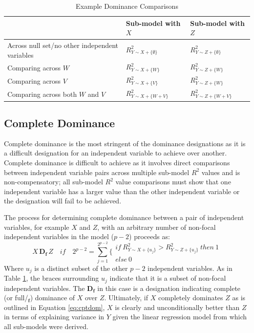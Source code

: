 \documentclass[man]{apa7}
\begin{document}
		\begin{table}[h!]
			\centering
			\caption{\centering Example Dominance Comparisons}
			\begin{tabular}{ l | l l }
				
				& Sub-model with $X$ & Sub-model with $Z$ \\
				\hline
				Across null set/no other independent variables & $R^2_{Y \sim X + \{\emptyset\}}$ & $R^2_{Y \sim Z+ \{\emptyset\} }$ \\
				Comparing across $W$ & $R^2_{Y \sim X + \{W\}}$ & $R^2_{Y \sim Z + \{W\}}$ \\
				Comparing across $V$ & $R^2_{Y \sim X + \{V\}}$ & $R^2_{Y \sim Z + \{W\}}$ \\
				Comparing across both $W$ and $V$ & $R^2_{Y \sim X + \{W + V\}}$ & $R^2_{Y \sim Z + \{W + V\}}$ \\
				\hline
		\end{tabular}
		\label{tab:exdom}
	\end{table}
	
	\subsection{Complete Dominance}
	
	Complete dominance is the most stringent of the dominance designations as it is a difficult designation for an independent variable to achieve over another.
	Complete dominance is difficult to achieve as it involves direct comparisons between independent variable pairs across multiple sub-model $R^2$ values and is non-compensatory; all sub-model $R^2$ value comparisons must show that one independent variable has a larger value than the other independent variable or the designation will fail to be achieved.
	
	The process for determining complete dominance between a pair of independent variables, for example $X$ and $Z$, with an arbitrary number of non-focal independent variables in the model ($p - 2$) proceeds as:
	\begin{equation}
		X \, \mathbf{D_f} \, Z \quad if \quad 2^{p-2} = \sum^{2^{p-2}}_{j=1} \Biggr\{ 
		\begin{array}{l}
			if \ R^2_{Y \sim X + \{u_j\}} > R^2_{Y \sim Z + \{u_j\}} \ then \ 1 \\
			else \ 0 
		\end{array}
		\label{eq:cptdom}
	\end{equation}
	Where $u_j$ is a distinct subset of the other $p - 2$ independent variables.
	As in Table \ref{tab:exdom}, the braces surrounding $u_j$ indicate that it is a subset of non-focal independent variables.
	The $\mathbf{D_f}$ in this case is a designation indicating complete (or full/$\mathbf{_f}$) dominance of $X$ over $Z$.
	Ultimately, if $X$ completely dominates $Z$ as is outlined in Equation \ref{eq:cptdom}, $X$ is clearly and unconditionally better than $Z$ in terms of explaining variance in $Y$ given the linear regression model from which all sub-models were derived.	
	
\end{document}
